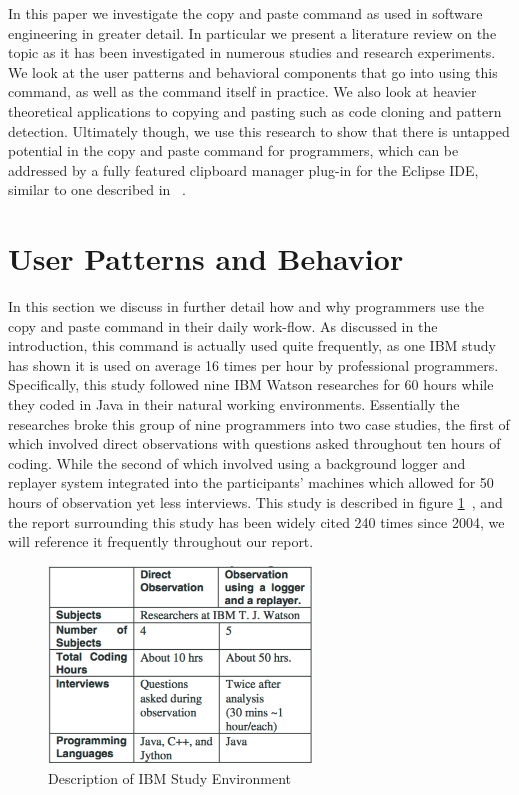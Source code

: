 \documentclass{acm_proc_article-sp}
\begin{document}
In this paper we investigate the copy and paste command as used in software engineering in greater detail. In particular we present a literature review on the topic as it has been investigated in numerous studies and research experiments. We look at the user patterns and behavioral components that go into using this command, as well as the command itself in practice. We also look at heavier theoretical applications to copying and pasting such as code cloning and pattern detection. Ultimately though, we use this research to show that there is untapped potential in the copy and paste command for programmers, which can be addressed by a fully featured clipboard manager plug-in for the Eclipse IDE, similar to one described in ~\cite{ooplCP}.

\section{User Patterns and Behavior}\label{sec:patterns}

In this section we discuss in further detail how and why programmers use the copy and paste command in their daily work-flow. As discussed in the introduction, this command is actually used quite frequently, as one IBM study has shown it is used on average 16 times per hour by professional programmers. Specifically, this study followed nine IBM Watson researches for 60 hours while they coded in Java in their natural working environments. Essentially the researches broke this group of nine programmers into two case studies, the first of which involved direct observations with questions asked throughout ten hours of coding. While the second of which involved using a background logger and replayer system integrated into the participants' machines which allowed for 50 hours of observation yet less interviews. This study is described in figure  \ref{fig:oopl}~\cite{ooplCP}, and the report surrounding this study has been widely cited 240 times since 2004, we will reference it frequently throughout our report.

\begin{figure}[h]
\centering
\includegraphics[width=7cm]{ooplStudy}
\caption{Description of IBM Study Environment}
\label{fig:oopl}
\end{figure}
\end{document}
